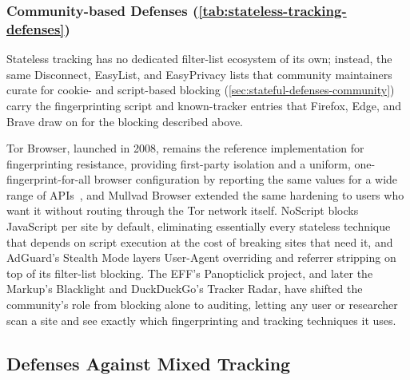\subsubsection{Community-based Defenses (\autoref{tab:stateless-tracking-defenses})}
\label{sec:stateless-defenses-community}



%
Stateless tracking has no dedicated filter-list ecosystem of its own; instead, the same Disconnect, EasyList, and EasyPrivacy lists that community maintainers curate for cookie- and script-based blocking (\autoref{sec:stateful-defenses-community}) carry the fingerprinting script and known-tracker entries that Firefox, Edge, and Brave draw on for the blocking described above.


%
Tor Browser, launched in 2008, remains the reference implementation for fingerprinting resistance, providing first-party isolation and a uniform, one-fingerprint-for-all browser configuration by reporting the same values for a wide range of APIs~\cite{perryDesignImplementationTor2013}, and Mullvad Browser extended the same hardening to users who want it without routing through the Tor network itself.
%
NoScript blocks JavaScript per site by default, eliminating essentially every stateless technique that depends on script execution at the cost of breaking sites that need it, and AdGuard's Stealth Mode layers User-Agent overriding and referrer stripping on top of its filter-list blocking.
%
The EFF's Panopticlick project, and later the Markup's Blacklight and DuckDuckGo's Tracker Radar, have shifted the community's role from blocking alone to auditing, letting any user or researcher scan a site and see exactly which fingerprinting and tracking techniques it uses.








\subsection{Defenses Against Mixed Tracking}
\label{sec:mixed-defenses}



